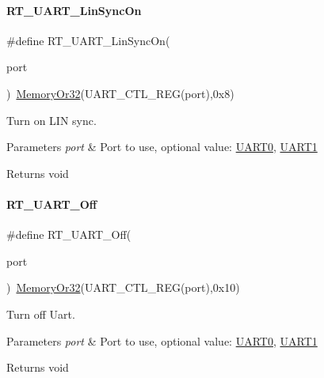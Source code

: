 \paragraph{\texorpdfstring{R\+T\+\_\+\+U\+A\+R\+T\+\_\+\+Lin\+Sync\+On}{RT\_UART\_LinSyncOn}}
{\footnotesize\ttfamily \#define R\+T\+\_\+\+U\+A\+R\+T\+\_\+\+Lin\+Sync\+On(\begin{DoxyParamCaption}\item[{}]{port }\end{DoxyParamCaption})~\mbox{\hyperlink{a00020_a27874a97deab7cecdde5ddecf466e31e}{Memory\+Or32}}(U\+A\+R\+T\+\_\+\+C\+T\+L\+\_\+\+R\+EG(port),0x8)}



Turn on L\+IN sync. 


\begin{DoxyParams}{Parameters}
{\em port} & Port to use, optional value\+: \mbox{\hyperlink{a00056_a0508661f121639ffdee7de2353a0def2}{U\+A\+R\+T0}}, \mbox{\hyperlink{a00056_a8d69bf04d07af4fbbab5a8bd291f65ff}{U\+A\+R\+T1}} \\
\hline
\end{DoxyParams}
\begin{DoxyReturn}{Returns}
void 
\end{DoxyReturn}
\mbox{\label{a00056_a60de547d761052a56b69e4a75493b831}} 
\paragraph{\texorpdfstring{R\+T\+\_\+\+U\+A\+R\+T\+\_\+\+Off}{RT\_UART\_Off}}
{\footnotesize\ttfamily \#define R\+T\+\_\+\+U\+A\+R\+T\+\_\+\+Off(\begin{DoxyParamCaption}\item[{}]{port }\end{DoxyParamCaption})~\mbox{\hyperlink{a00020_a27874a97deab7cecdde5ddecf466e31e}{Memory\+Or32}}(U\+A\+R\+T\+\_\+\+C\+T\+L\+\_\+\+R\+EG(port),0x10)}



Turn off Uart. 


\begin{DoxyParams}{Parameters}
{\em port} & Port to use, optional value\+: \mbox{\hyperlink{a00056_a0508661f121639ffdee7de2353a0def2}{U\+A\+R\+T0}}, \mbox{\hyperlink{a00056_a8d69bf04d07af4fbbab5a8bd291f65ff}{U\+A\+R\+T1}} \\
\hline
\end{DoxyParams}
\begin{DoxyReturn}{Returns}
void 
\end{DoxyReturn}
\mbox{\label{a00056_a7c1428a7b16eec7fe710679dd70b4069}} 

